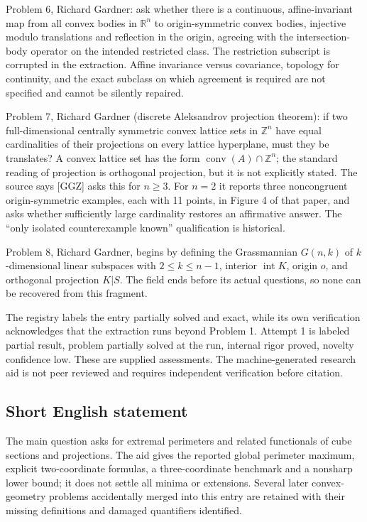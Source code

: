 \documentclass[11pt]{article}
\newcommand{\Z}{\mathbb{Z}}
\newcommand{\R}{\mathbb{R}}
\begin{document}
Problem 6, Richard Gardner: ask whether there is a continuous, affine-invariant map from all convex bodies in \(\R^n\) to origin-symmetric convex bodies, injective modulo translations and reflection in the origin, agreeing with the intersection-body operator on the intended restricted class. The restriction subscript is corrupted in the extraction. Affine invariance versus covariance, topology for continuity, and the exact subclass on which agreement is required are not specified and cannot be silently repaired.

Problem 7, Richard Gardner (discrete Aleksandrov projection theorem): if two full-dimensional centrally symmetric convex lattice sets in \(\Z^n\) have equal cardinalities of their projections on every lattice hyperplane, must they be translates? A convex lattice set has the form \(\operatorname{conv}(A)\cap\Z^n\); the standard reading of projection is orthogonal projection, but it is not explicitly stated. The source says [GGZ] asks this for \(n\ge3\). For \(n=2\) it reports three noncongruent origin-symmetric examples, each with 11 points, in Figure 4 of that paper, and asks whether sufficiently large cardinality restores an affirmative answer. The ``only isolated counterexample known'' qualification is historical.

Problem 8, Richard Gardner, begins by defining the Grassmannian \(G(n,k)\) of \(k\)-dimensional linear subspaces with \(2\le k\le n-1\), interior \(\operatorname{int}K\), origin \(o\), and orthogonal projection \(K|S\). The field ends before its actual questions, so none can be recovered from this fragment.

The registry labels the entry partially solved and exact, while its own verification acknowledges that the extraction runs beyond Problem 1. Attempt 1 is labeled partial result, problem partially solved at the run, internal rigor proved, novelty confidence low. These are supplied assessments. The machine-generated research aid is not peer reviewed and requires independent verification before citation.
\subsection{Short English statement}
The main question asks for extremal perimeters and related functionals of cube sections and projections. The aid gives the reported global perimeter maximum, explicit two-coordinate formulas, a three-coordinate benchmark and a nonsharp lower bound; it does not settle all minima or extensions. Several later convex-geometry problems accidentally merged into this entry are retained with their missing definitions and damaged quantifiers identified.
\end{document}
